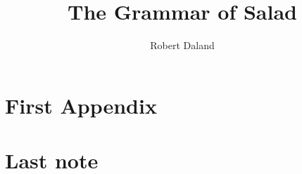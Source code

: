 \documentclass{book}
\title{The Grammar of Salad}
\author{Robert Daland}
\begin{document}
\frontmatter
    \maketitle \newpage
    
    
    \tableofcontents

\mainmatter
    

    \appendix
    \chapter{First Appendix}

\backmatter
    \chapter{Last note}
\end{document}
